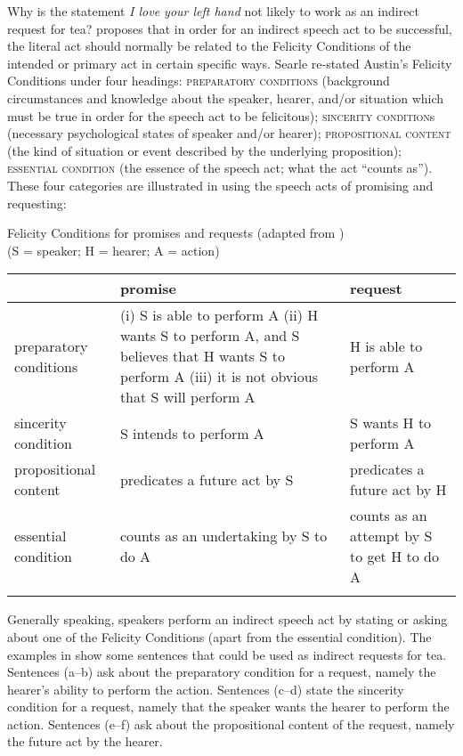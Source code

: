 Why is the statement \textit{I love your left hand} not likely to work as an indirect request for tea? \citet{Searle1969,Searle1975} proposes that in order for an indirect speech act to be successful, the literal act should normally be related to the Felicity Conditions of the intended or primary act in certain specific ways. Searle re-stated Austin’s Felicity Conditions under four headings: \textsc{preparatory conditions} (background circumstances and knowledge about the speaker, hearer, and/or situation which must be true in order for the speech act to be felicitous); \textsc{sincerity condition}s (necessary psychological states of speaker and/or hearer); \textsc{propositional content} (the kind of situation or event described by the underlying proposition); \textsc{essential condition} (the essence of the speech act; what the act “counts as”). These four categories are illustrated in  using the speech acts of promising and requesting:

\ea \label{ex:10.7}
 {Felicity Conditions for promises and requests} (adapted from \citealt{Searle1969,Searle1975})\\
(S = speaker; H = hearer; A = action)

\noindent
{\small
\begin{tabularx}{.9\textwidth}{lQQ}
\lsptoprule
&   promise &   request\\
\midrule
  preparatory conditions & (i) S is able to perform A\newline
				  (ii) H wants S to perform A, and S believes that H wants S to perform A\newline
				  (iii) it is not obvious that S will perform A 
										  & H is able to perform A \\
\tablevspace
  sincerity condition & S intends to perform A & S wants H to perform A\\

\tablevspace
  propositional content & predicates a future act by S & predicates a future act by H\\

\tablevspace
  essential condition & counts as an undertaking by S to do A & counts as an attempt by S to get H to do A\\
\lspbottomrule
\end{tabularx}
}
\z

Generally speaking, speakers perform an indirect speech act by stating or asking about one of the Felicity Conditions (apart from the essential condition). The examples in  show some sentences that could be used as indirect requests for tea. Sentences (a--b) ask about the preparatory condition for a request, namely the hearer’s ability to perform the action. Sentences (c--d) state the sincerity condition for a request, namely that the speaker wants the hearer to perform the action. Sentences (e--f) ask about the propositional content of the request, namely the future act by the hearer.


